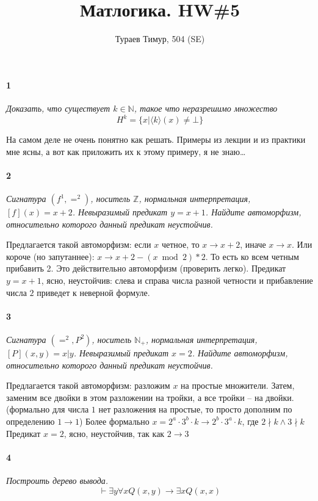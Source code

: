 \documentclass[russian]{article}
\begin{document}
\title{Матлогика. HW\#5}
\author{Тураев Тимур, 504 (SE)}

\maketitle

\paragraph{1} \textit{Доказать, что существует $k\in \mathbb{N}$, такое что неразрешимо множество \[ H^k = \{ x | \langle k \rangle (x) \neq \bot \} \]}

На самом деле не очень понятно как решать. Примеры из лекции и из практики мне ясны, а вот как приложить их к этому примеру, я не знаю…

\paragraph{2} \textit{Сигнатура $(f^1, =^2)$, носитель $\mathbb{Z}$, нормальная интерпретация, $[f](x) = x + 2$. Невыразимый предикат $y = x + 1$. Найдите автоморфизм, относительно которого данный предикат неустойчив.}

Предлагается такой автоморфизм: если $x$ четное, то $x \rightarrow x +2$, иначе $x \rightarrow x$. Или короче (но запутаннее): $x \rightarrow x + 2 - (x \bmod 2) * 2$. То есть ко всем четным прибавить 2. Это действительно автоморфизм (проверить легко).
Предикат $y = x + 1$, ясно, неустойчив: слева и справа числа разной четности и прибавление числа $2$ приведет к неверной формуле.

\paragraph{3} \textit{Сигнатура $(=^2, P^2)$, носитель $\mathbb{N}_+$, нормальная интерпретация, $[P](x, y) = x | y$. Невыразимый предикат $x = 2$. Найдите автоморфизм, относительно которого данный предикат неустойчив.}

Предлагается такой автоморфизм: разложим $x$ на простые множители. Затем, заменим все двойки в этом разложении на тройки, а все тройки -- на двойки. (формально для числа $1$ нет разложения на простые, то просто дополним по определению $1 \rightarrow 1$) Более формально $x = 2^a \cdot 3^b \cdot k \rightarrow 2^b \cdot 3^a \cdot k$, где $2 \nmid k \wedge 3 \nmid k$
Предикат $x = 2$, ясно, неустойчив, так как $2 \to 3$

\paragraph{4} \textit{Построить дерево вывода.
\[
\vdash \exists y \forall x Q(x,y) \rightarrow \exists x Q(x, x)
\]}
\end{document}
